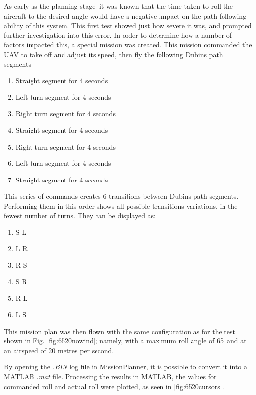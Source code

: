 As early as the planning stage, it was known that the time taken to roll the aircraft to the desired angle would have a negative impact on the path following ability of this system. This first test showed just how severe it was, and prompted further investigation into this error. In order to determine how a number of factors impacted this, a special mission was created. This mission commanded the UAV to take off and adjust its speed, then fly the following Dubins path segments:

\begin{enumerate}
	\item Straight segment for 4 seconds
	\item Left turn segment for 4 seconds
	\item Right turn segment for 4 seconds
	\item Straight segment for 4 seconds
	\item Right turn segment for 4 seconds
	\item Left turn segment for 4 seconds
	\item Straight segment for 4 seconds
\end{enumerate}

This series of commands creates 6 transitions between Dubins path segments. Performing them in this order shows all possible transitions variations, in the fewest number of turns. They can be displayed as:

\begin{enumerate}
	\item S \textrightarrow L
	\item L \textrightarrow R
	\item R \textrightarrow S
	\item S \textrightarrow R
	\item R \textrightarrow L
	\item L \textrightarrow S
\end{enumerate}

This mission plan was then flown with the same configuration as for the test shown in Fig. \ref{fig:6520nowind}; namely, with a maximum roll angle of 65\degree\ and at an airspeed of 20 metres per second. 

By opening the \textit{.BIN} log file in MissionPlanner, it is possible to convert it into a MATLAB \textit{.mat} file. Processing the results in MATLAB, the values for commanded roll and actual roll were plotted, as seen in \ref{fig:6520cursors}. 

